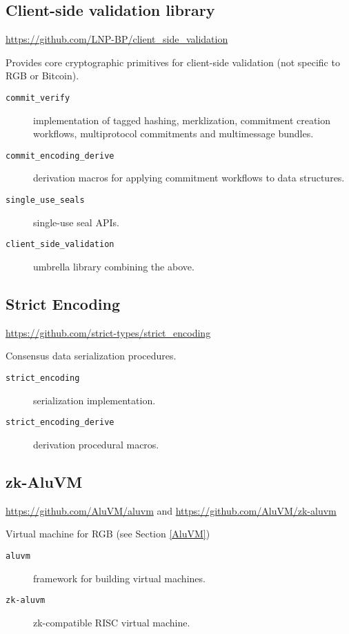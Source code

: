 \documentclass[9pt,oneside]{amsart}
\begin{document}
\subsection{Client-side validation library}

\url{https://github.com/LNP-BP/client_side_validation}

Provides core cryptographic primitives for client-side validation (not specific to RGB or Bitcoin).

\begin{description}
   \item[\texttt{commit\_verify}] implementation of tagged hashing, merklization,
   commitment creation workflows, multiprotocol commitments and multimessage bundles.
   \item[\texttt{commit\_encoding\_derive}]
   derivation macros for applying commitment workflows to data structures.
   \item[\texttt{single\_use\_seals}]
   single-use seal APIs.
   \item[\texttt{client\_side\_validation}]
   umbrella library combining the above.
\end{description}

\subsection{Strict Encoding}

\url{https://github.com/strict-types/strict_encoding}

Consensus data serialization procedures.

\begin{description}
    \item[\texttt{strict\_encoding}] serialization implementation.
    \item[\texttt{strict\_encoding\_derive}] derivation procedural macros.
\end{description}

\subsection{zk-AluVM}

\url{https://github.com/AluVM/aluvm} and \url{https://github.com/AluVM/zk-aluvm}

Virtual machine for RGB (see Section \ref{AluVM})

\begin{description}
    \item[\texttt{aluvm}] framework for building virtual machines.
    \item[\texttt{zk-aluvm}] zk-compatible RISC virtual machine.
\end{description}
\end{document}
